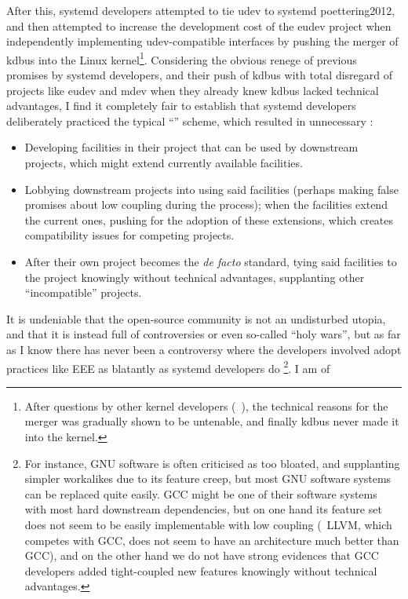After this, systemd developers attempted to tie udev to systemd\cupercite%
{poettering2012}, and then attempted to increase the development cost of the
eudev project when independently implementing udev-compatible interfaces%
 by pushing the merger of kdbus into the Linux
kernel\footnote{After questions by other kernel developers (\eg~\parencite%
{lutomirski2015}), the technical reasons for the merger
was gradually shown to be untenable, and finally kdbus never made it into the
kernel.}.  Considering the obvious renege of previous promises by systemd
developers, and their push of kdbus
with total disregard of projects like eudev and mdev when they already knew
kdbus lacked technical advantages, I find it completely
fair to establish that systemd developers deliberately practiced the typical
``'' scheme,
which resulted in unnecessary :
\begin{itemize}
\item Developing facilities in their project that can be used by downstream
	projects, which might extend currently available facilities.
\item Lobbying downstream projects into using said facilities (perhaps making
	false promises about low coupling during the process); when the facilities
	extend the current ones, pushing for the adoption of these extensions,
	which creates compatibility issues for competing projects.
\item After their own project becomes the \emph{de facto} standard, tying
	said facilities to the project knowingly without technical advantages,
	supplanting other ``incompatible'' projects.
\end{itemize}
It is undeniable that the open-source community is not an undisturbed utopia,
and that it is instead full of controversies or even so-called ``holy wars'',
but as far as I know there has never been a controversy where the developers
involved adopt practices like EEE as blatantly as systemd developers do%
\footnote{For instance, GNU software is often criticised as too bloated, and
supplanting simpler workalikes due to its feature creep, but most GNU software
systems can be replaced quite easily.  GCC might be one of their software
systems with most hard downstream dependencies, but on one hand its feature set
does not seem to be easily implementable with low coupling (\eg~LLVM, which
competes with GCC, does not seem to have an architecture much better than GCC),
and on the other hand we do not have strong evidences that GCC developers added
tight-coupled new features knowingly without technical advantages.}.  I am of
